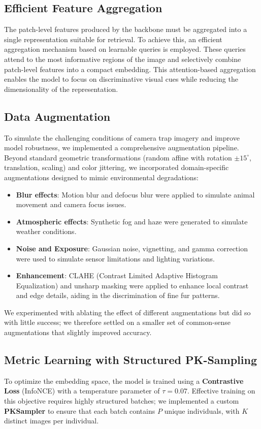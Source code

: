 \documentclass{article}
\begin{document}
\subsection{Efficient Feature Aggregation}
The patch-level features produced by the backbone must be aggregated into a single representation suitable for retrieval. To achieve this, an efficient aggregation mechanism based on learnable queries is employed. These queries attend to the most informative regions of the image and selectively combine patch-level features into a compact embedding. This attention-based aggregation enables the model to focus on discriminative visual cues while reducing the dimensionality of the representation.

\subsection{Data Augmentation}
To simulate the challenging conditions of camera trap imagery and improve model robustness, we implemented a comprehensive augmentation pipeline. Beyond standard geometric transformations (random affine with rotation $\pm 15^\circ$, translation, scaling) and color jittering, we incorporated domain-specific augmentations designed to mimic environmental degradations:
\begin{itemize}
    \item \textbf{Blur effects}: Motion blur and defocus blur were applied to simulate animal movement and camera focus issues.
    \item \textbf{Atmospheric effects}: Synthetic fog and haze were generated to simulate weather conditions.
    \item \textbf{Noise and Exposure}: Gaussian noise, vignetting, and gamma correction were used to simulate sensor limitations and lighting variations.
    \item \textbf{Enhancement}: CLAHE (Contrast Limited Adaptive Histogram Equalization) and unsharp masking were applied to enhance local contrast and edge details, aiding in the discrimination of fine fur patterns.
\end{itemize}
We experimented with ablating the effect of different augmentations but did so with little success; we therefore settled on a smaller set of common-sense augmentations that slightly improved accuracy.

\subsection{Metric Learning with Structured PK-Sampling}
To optimize the embedding space, the model is trained using a \textbf{Contrastive Loss} (InfoNCE) with a temperature parameter of $\tau=0.07$. Effective training on this objective requires highly structured batches; we implemented a custom \textbf{PKSampler} to ensure that each batch contains $P$ unique individuals, with $K$ distinct images per individual. 
\end{document}
